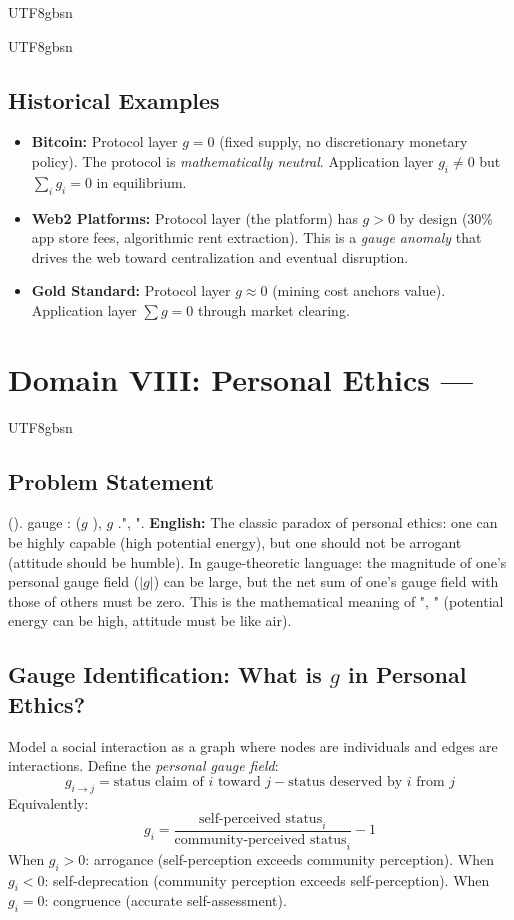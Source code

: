 \documentclass[11pt,a4paper]{article}
\begin{document}
\begin{CJK}{UTF8}{gbsn}
{\begin{CJK}{UTF8}{gbsn}
\subsection{Historical Examples}
\begin{itemize}
    \item \textbf{Bitcoin:} Protocol layer $g = 0$ (fixed supply, no discretionary
          monetary policy). The protocol is \textit{mathematically neutral}. Application
          layer $g_i \neq 0$ but $\sum_i g_i = 0$ in equilibrium.
    \item \textbf{Web2 Platforms:} Protocol layer (the platform) has $g > 0$ by design
          (30\% app store fees, algorithmic rent extraction). This is a \textit{gauge
          anomaly} that drives the web toward centralization and eventual disruption.
    \item \textbf{Gold Standard:} Protocol layer $g \approx 0$ (mining cost anchors
          value). Application layer $\sum g = 0$ through market clearing.
\end{itemize}
\end{CJK}
\section{Domain VIII: Personal Ethics ---}
\label{sec:ethics}
\begin{CJK}{UTF8}{gbsn}
\subsection{Problem Statement}
\noindent
(). gauge : ($g$ ), 
 $g$ .", ".
\vspace{0.3cm}
\noindent
\textbf{English:} The classic paradox of personal ethics: one can be highly capable
(high potential energy), but one should not be arrogant (attitude should be humble).
In gauge-theoretic language: the magnitude of one's personal gauge field ($|g|$) can
be large, but the net sum of one's gauge field with those of others must be zero.
This is the mathematical meaning of ", " (potential energy can be
high, attitude must be like air).
\subsection{Gauge Identification: What is $g$ in Personal Ethics?}
Model a social interaction as a graph where nodes are individuals and edges are
interactions. Define the \textit{personal gauge field}:
\begin{equation}
    g_{i \to j} = \text{status claim of $i$ toward $j$} - \text{status deserved by $i$ from $j$}
\end{equation}
Equivalently:
\begin{equation}
    g_i = \frac{\text{self-perceived status}_i}{\text{community-perceived status}_i} - 1
\end{equation}
When $g_i > 0$: arrogance (self-perception exceeds community perception).
When $g_i < 0$: self-deprecation (community perception exceeds self-perception).
When $g_i = 0$: congruence (accurate self-assessment).

\end{CJK}}
\end{CJK}
\end{document}
